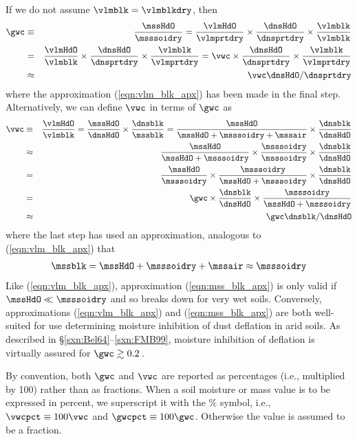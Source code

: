 \documentclass[12pt,twoside]{book}
\begin{document}
If we do not assume $\vlmblk = \vlmblkdry$, then
\begin{eqnarray}
\gwc & \equiv & \frac{\mssHdO}{\msssoidry} = 
\frac{\vlmHdO}{\vlmprtdry} \times 
\frac{\dnsHdO}{\dnsprtdry} \times
\frac{\vlmblk}{\vlmblk} \nonumber \\
& = & 
\frac{\vlmHdO}{\vlmblk} \times 
\frac{\dnsHdO}{\dnsprtdry} \times
\frac{\vlmblk}{\vlmprtdry} =
\vwc \times \frac{\dnsHdO}{\dnsprtdry} \times \frac{\vlmblk}{\vlmprtdry}
\nonumber \\
& \approx & \vwc \dnsHdO /\dnsprtdry
\label{eqn:gwc_vwc}
\end{eqnarray}
where the approximation (\ref{eqn:vlm_blk_apx}) has been made in the
final step.
Alternatively, we can define $\vwc$ in terms of $\gwc$ as
\begin{eqnarray}
\vwc & \equiv & \frac{\vlmHdO}{\vlmblk} = 
\frac{\mssHdO}{\dnsHdO} \times \frac{\dnsblk}{\mssblk}  =
\frac{\mssHdO}{\mssHdO + \msssoidry + \mssair} \times
\frac{\dnsblk}{\dnsHdO} \nonumber \\
& \approx & 
\frac{\mssHdO}{\mssHdO + \msssoidry} \times
\frac{\msssoidry}{\msssoidry} \times
\frac{\dnsblk}{\dnsHdO} \nonumber \\
& = & 
\frac{\mssHdO}{\msssoidry} \times 
\frac{\msssoidry}{\mssHdO + \msssoidry} \times 
\frac{\dnsblk}{\dnsHdO} \nonumber \\ 
& = & 
\gwc \times \frac{\dnsblk}{\dnsHdO} \times
\frac{\msssoidry}{\mssHdO + \msssoidry} \nonumber \\
& \approx & \gwc \dnsblk / \dnsHdO
\label{eqn:vwc_gwc}
\end{eqnarray}
where the last step has used an approximation, analogous to
(\ref{eqn:vlm_blk_apx}) that
\begin{eqnarray}
\mssblk = \mssHdO + \msssoidry + \mssair \approx \msssoidry 
\label{eqn:mss_blk_apx}
\end{eqnarray}
Like (\ref{eqn:vlm_blk_apx}), approximation (\ref{eqn:mss_blk_apx}) 
is only valid if $\mssHdO \ll \msssoidry$ and so breaks down for very
wet soils. 
Conversely, approximations (\ref{eqn:vlm_blk_apx}) and
(\ref{eqn:mss_blk_apx}) are both well-suited for use determining
moisture inhibition of dust deflation in arid soils.
As described in \S\ref{sxn:Bel64}--\ref{sxn:FMB99}, moisture
inhibition of deflation is virtually assured for 
$\gwc \gtrsim 0.2$\,\kgxkg. 

By convention, both $\gwc$ and $\vwc$ are reported as percentages
(i.e., multiplied by 100) rather than as fractions. 
When a soil moisture or mass value is to be expressed in percent,
we superscript it with the \% symbol, i.e., 
$\vwcpct \equiv 100 \vwc$ and $\gwcpct \equiv 100 \gwc$.
Otherwise the value is assumed to be a fraction.
\end{document}
